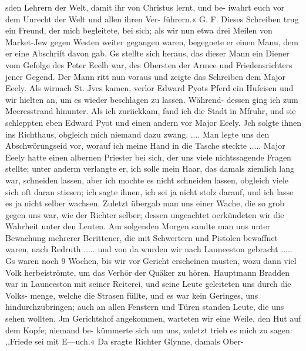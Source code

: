 sden Lehrern der Welt, damit ihr von Christus lernt, und be-
iwahrt euch vor dem Unrecht der Welt und allen ihren Ver-
führern.« G. F.
Dieses Schreiben trug ein Freund, der mich begleitete, bei
sich; als wir nun etwa drei Meilen von Market-Jew gegen
Westen weiter gegangen waren, begegnete er einen Manu, dem
er eine Abschrift davon gab. Gs stellte sich heraus, das dieser
Mann ein Diener vom Gefolge des Peter Eeelh war, des
Obersten der Armee und Friedensrichters jener Gegend. Der Mann
ritt nun voraus und zeigte das Schreiben dem Major Eeely. Als
wirnach St. Jves kamen, verlor Edward Pyots Pferd ein Hufeisen
und wir hielten an, um es wieder beschlagen zu lassen. Während-
dessen ging ich zum Meeresstrand hinunter. Als ich zuriickkam,
fand ich die Stadt in Mfruhr, und sie schleppten eben Edward
Pyot und einen andern vor Major Eeely. Jch solgte ihnen ins
Richthaus, obgleich mich niemand dazu zwang. .... Man
legte uns den Abschwörungseid vor, worauf ich meine Hand in
die Tasche steckte ..... Major Eeely hatte einen albernen
Priester bei sich, der uns viele nichtssagende Fragen stellte; unter
anderm verlangte er, ich solle mein Haar, das damals ziemlich
lang war, schneiden lassen, aber ich mochte es nicht schneiden
lassen, obgleich viele sich oft daran stiesen; ich sagte ihnen, ich
sei ja nicht stolz darauf, und ich lasse es ja nicht selber wachsen.
Zuletzt übergab man uns einer Wache, die so grob gegen uns
war, wie der Richter selber; dessen ungeachtet oerkündeten wir
die Wahrheit unter den Leuten. Am solgenden Morgen sandte
man uns unter Bewachung mehrerer Berittener, die mit Schwertern
und Pistolen bewaffnet waren, nach Redruth ..... und von da
wurden wir nach Launeeston gebracht .....
Gs waren noch 9 Wochen, bis wir vor Gericht erscheinen
musten, wozu dann viel Volk herbeiströmte, um das Verhör der
Quäker zu hören. Hauptmann Bradden war in Launeeston mit
seiner Reiterei, und seine Leute geleiteten uns durch die Volks-
menge, welche die Strasen füllte, und es war kein Geringes, uns
hindurchzubringen; auch an allen Fenstern und Türen standen
Leute, die uns sehen wollten. Jm Gerichtshof angekommen,
warteten wir eine Weile, den Hut auf dem Kopfe; niemand be-
kümmerte sich um uns, zuletzt trieb es mich zu sagen: ,,Friede
sei mit E—uch.« Da sragte Richter Glynne, damals Ober-


